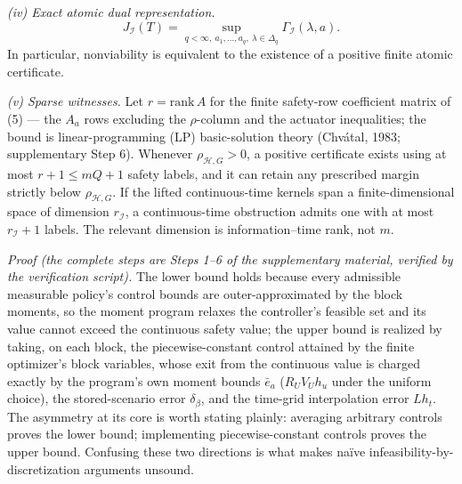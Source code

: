 \documentclass[10pt,twocolumn]{article}
\theoremstyle{plain}
\theoremstyle{definition}
\theoremstyle{remark}
\begin{document}
\noindent\emph{(iv) Exact atomic dual representation.}
\[
J_{\mathcal{I}}(T) = \sup_{q < \infty,\ a_1,\dots,a_q,\
\lambda \in \Delta_q} \Gamma_{\mathcal{I}}(\lambda, a).
\tag{9}
\]
In particular, nonviability is equivalent to the existence of a positive
finite atomic certificate.

\noindent\emph{(v) Sparse witnesses.} Let \(r = \mathrm{rank}\, A\) for the
finite safety-row coefficient matrix of (5) --- the \(A_a\) rows excluding
the \(\rho\)-column and the actuator inequalities; the bound is linear-programming (LP)
basic-solution theory (Chv\'{a}tal, 1983; supplementary Step 6). Whenever \(\rho_{\mathcal{H},G} > 0\), a
positive certificate exists using at most \(r + 1 \le mQ + 1\) safety labels,
and it can retain any prescribed margin strictly below
\(\rho_{\mathcal{H},G}\). If the lifted continuous-time kernels span a
finite-dimensional space of dimension \(r_{\mathcal{I}}\), a continuous-time
obstruction admits one with at most \(r_{\mathcal{I}} + 1\) labels. The relevant
dimension is information--time rank, not \(m\).

\emph{Proof (the complete steps are Steps 1--6 of the supplementary
material, verified by the verification script).} The lower bound holds because every admissible
measurable policy's control bounds are outer-approximated by the block
moments, so the moment program relaxes the controller's feasible set and
its value cannot exceed the continuous safety value; the upper bound is
realized by taking, on each block, the piecewise-constant control attained
by the finite optimizer's block variables, whose exit from the continuous
value is charged exactly by the program's own moment bounds \(\bar{e}_a\)
(\(R_U V_U h_u\) under the uniform choice), the stored-scenario error
\(\delta_\beta\), and the time-grid interpolation error \(L h_t\). The asymmetry at its core is
worth stating plainly: averaging arbitrary controls proves the lower bound;
implementing piecewise-constant controls proves the upper bound. Confusing
these two directions is what makes na\"ive infeasibility-by-discretization
arguments unsound.
\end{document}
